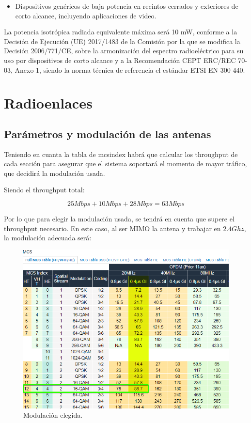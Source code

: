 \documentclass{article}
\begin{document}
\begin{itemize}
    \item Dispositivos genéricos de baja potencia en recintos cerrados y exteriores
    de corto alcance, incluyendo aplicaciones de video.
\end{itemize}
    La potencia isotrópica radiada equivalente máxima será 10 mW, conforme a la
    Decisión de Ejecución (UE) 2017/1483 de la Comisión por la que se modifica la
    Decisión 2006/771/CE, sobre la armonización del espectro radioeléctrico para su uso
    por dispositivos de corto alcance y a la Recomendación CEPT ERC/REC 70-03,
    Anexo 1, siendo la norma técnica de referencia el estándar ETSI EN 300 440. 


\section{Radioenlaces}

\subsection{Parámetros y modulación de las antenas}

Teniendo en cuanta la tabla de mcsindex habrá que calcular los throughput de cada sección para asegurar que el sistema soportará el momento de mayor tráfico, que decidirá la modulación usada. 

Siendo el throughput total:

$$25Mbps + 10Mbps + 28Mbps = 63Mbps$$

Por lo que para elegir la modulación usada, se tendrá en cuenta que supere el throughput necesario. En este caso, al ser MIMO la antena y trabajar en $2.4Ghz$, la modulación adecuada será:

\begin{figure}[ht]
    \centering
    \includegraphics[width=0.8
    \linewidth]{src/mcsindex.png}
    \caption{\label{fig:mcsindex} Modulación elegida.}
\end{figure}
\end{document}
